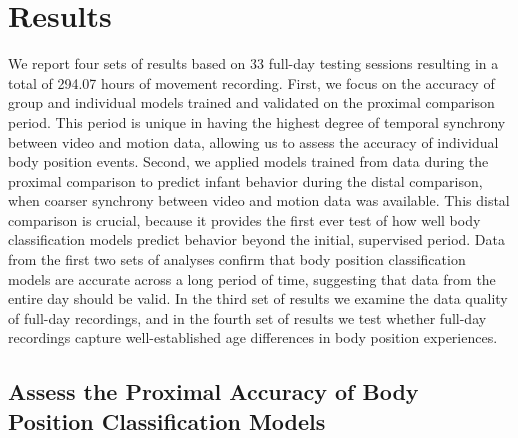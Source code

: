 \documentclass[
  man]{apa6}
\begin{document}
\hypertarget{results}{%
\section{Results}\label{results}}

We report four sets of results based on 33 full-day testing sessions resulting in a total of 294.07 hours of movement recording. First, we focus on the accuracy of group and individual models trained and validated on the proximal comparison period. This period is unique in having the highest degree of temporal synchrony between video and motion data, allowing us to assess the accuracy of individual body position events. Second, we applied models trained from data during the proximal comparison to predict infant behavior during the distal comparison, when coarser synchrony between video and motion data was available. This distal comparison is crucial, because it provides the first ever test of how well body classification models predict behavior beyond the initial, supervised period. Data from the first two sets of analyses confirm that body position classification models are accurate across a long period of time, suggesting that data from the entire day should be valid. In the third set of results we examine the data quality of full-day recordings, and in the fourth set of results we test whether full-day recordings capture well-established age differences in body position experiences.

\hypertarget{assess-the-proximal-accuracy-of-body-position-classification-models}{%
\subsection{Assess the Proximal Accuracy of Body Position Classification Models}\label{assess-the-proximal-accuracy-of-body-position-classification-models}}
\end{document}

